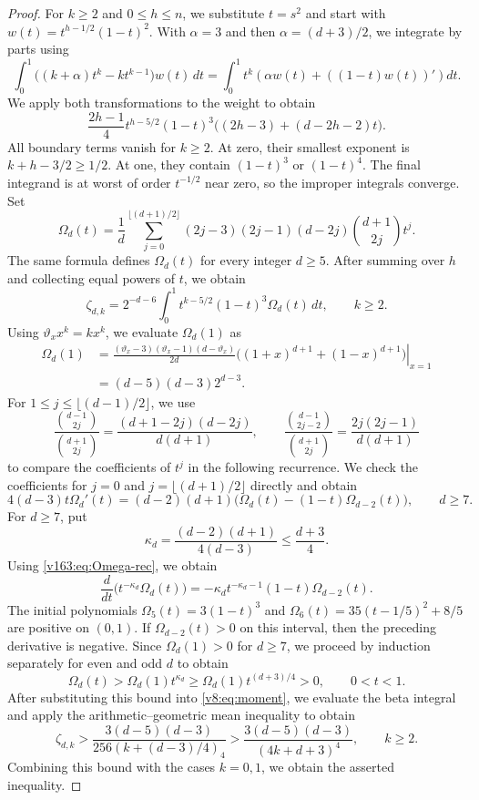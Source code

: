 \documentclass[10pt,a4paper]{article}
\numberwithin{equation}{section}
\theoremstyle{remark}\newtheorem{remark}[theorem]{Remark}
\newcommand{\varthetax}{\vartheta_x}
\begin{document}
\begin{proof}
For $k\ge2$ and $0\le h\le n$, we substitute $t=s^2$ and start with
$w(t)=t^{h-1/2}(1-t)^2$. With $\alpha=3$ and then $\alpha=(d+3)/2$,
we integrate by parts using
\[
 \int_0^1\bigl((k+\alpha)t^k-kt^{k-1}\bigr)w(t)\,dt
 =\int_0^1t^k\left(\alpha w(t)+((1-t)w(t))'\right)dt.
\]
We apply both transformations to the weight to obtain
\[
 \frac{2h-1}{4}t^{h-5/2}(1-t)^3
 \bigl((2h-3)+(d-2h-2)t\bigr).
\]
All boundary terms vanish for $k\ge2$. At zero, their smallest
exponent is $k+h-3/2\ge1/2$. At one, they contain $(1-t)^3$ or
$(1-t)^4$. The final integrand is at worst of order $t^{-1/2}$
near zero, so the improper integrals converge. Set
\[
 \Omega_d(t)=\frac1d\sum_{j=0}^{\lfloor(d+1)/2\rfloor}
 (2j-3)(2j-1)(d-2j)\binom{d+1}{2j}t^j.
\]
The same formula defines $\Omega_d(t)$ for every integer $d\ge5$.
After summing over $h$ and collecting equal powers of $t$, we obtain
\begin{equation}\label{v8:eq:moment}
 \zeta_{d,k}=2^{-d-6}\int_0^1t^{k-5/2}(1-t)^3\Omega_d(t)\,dt,
 \qquad k\ge2.
\end{equation}
Using $\varthetax x^k=kx^k$, we evaluate $\Omega_d(1)$ as
\[
\begin{aligned}
 \Omega_d(1)
 &=\left.\frac{(\varthetax-3)(\varthetax-1)(d-\varthetax)}{2d}
 \bigl((1+x)^{d+1}+(1-x)^{d+1}\bigr)\right|_{x=1}\\
 &=(d-5)(d-3)2^{d-3}.
\end{aligned}
\]
For $1\le j\le\lfloor(d-1)/2\rfloor$, we use
\[
 \frac{\binom{d-1}{2j}}{\binom{d+1}{2j}}
 =\frac{(d+1-2j)(d-2j)}{d(d+1)},\qquad
 \frac{\binom{d-1}{2j-2}}{\binom{d+1}{2j}}
 =\frac{2j(2j-1)}{d(d+1)}
\]
to compare the coefficients of $t^j$ in the following recurrence. We check
the coefficients for $j=0$ and $j=\lfloor(d+1)/2\rfloor$ directly and obtain
\begin{equation}\label{v163:eq:Omega-rec}
 4(d-3)t\Omega_d'(t)
 =(d-2)(d+1)\bigl(\Omega_d(t)-(1-t)\Omega_{d-2}(t)\bigr),
 \qquad d\ge7.
\end{equation}
For $d\ge7$, put
\[
 \kappa_d=\frac{(d-2)(d+1)}{4(d-3)}\le\frac{d+3}4.
\]
Using \eqref{v163:eq:Omega-rec}, we obtain
\[
 \frac{d}{dt}\bigl(t^{-\kappa_d}\Omega_d(t)\bigr)
 =-\kappa_d t^{-\kappa_d-1}(1-t)\Omega_{d-2}(t).
\]
The initial polynomials $\Omega_5(t)=3(1-t)^3$ and
$\Omega_6(t)=35(t-1/5)^2+8/5$ are positive on $(0,1)$.
If $\Omega_{d-2}(t)>0$ on this interval, then the preceding derivative
is negative. Since $\Omega_d(1)>0$ for $d\ge7$, we proceed by induction
separately for even and odd $d$ to obtain
\[
 \Omega_d(t)>\Omega_d(1)t^{\kappa_d}
 \ge\Omega_d(1)t^{(d+3)/4}>0,\qquad 0<t<1.
\]
After substituting this bound into \eqref{v8:eq:moment}, we evaluate
the beta integral and apply the arithmetic--geometric mean inequality
to obtain
\[
 \zeta_{d,k}>
 \frac{3(d-5)(d-3)}{256(k+(d-3)/4)_4}
 >\frac{3(d-5)(d-3)}{(4k+d+3)^4},\qquad k\ge2.
\]
Combining this bound with the cases $k=0,1$, we obtain the asserted inequality.
\end{proof}
\end{document}

